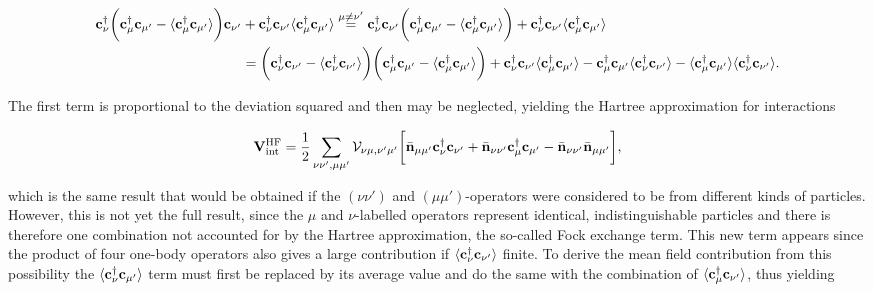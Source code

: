 \begin{equation}
    \begin{split}
    {\bf c}_{\nu}^\dagger \bigg({\bf c}_{\mu}^\dagger {\bf c}_{\mu'} - \langle {\bf c}_{\mu}^\dagger {\bf c}_{\mu'} \rangle \bigg) {\bf c}_{\nu'} &+ {\bf c}_{\nu}^\dagger {\bf c}_{\nu'} \langle {\bf c}_{\mu}^\dagger {\bf c}_{\mu'}\rangle \overset{{\mu \neq \nu'}}{=} {\bf c}_{\nu}^\dagger {\bf c}_{\nu'} \bigg({\bf c}_{\mu}^\dagger {\bf c}_{\mu'} - \langle {\bf c}_{\mu}^\dagger {\bf c}_{\mu'} \rangle \bigg) + {\bf c}_{\nu}^\dagger {\bf c}_{\nu'} \langle {\bf c}_{\mu}^\dagger {\bf c}_{\mu'}\rangle \\
    &= \bigg({\bf c}_{\nu}^\dagger {\bf c}_{\nu'} - \langle {\bf c}_{\nu}^\dagger {\bf c}_{\nu'} \rangle\bigg) \bigg({\bf c}_{\mu}^\dagger {\bf c}_{\mu'} - \langle {\bf c}_{\mu}^\dagger {\bf c}_{\mu'} \rangle \bigg) + {\bf c}_{\nu}^\dagger {\bf c}_{\nu'} \langle {\bf c}_{\mu}^\dagger {\bf c}_{\mu'}\rangle - {\bf c}_{\mu}^\dagger {\bf c}_{\mu'} \langle {\bf c}_{\nu}^\dagger {\bf c}_{\nu'} \rangle - \langle {\bf c}_{\mu}^\dagger {\bf c}_{\mu'} \rangle \langle {\bf c}_{\nu}^\dagger {\bf c}_{\nu'} \rangle.
    \end{split}
\end{equation}

The first term is proportional to the deviation squared and then may be neglected, yielding the Hartree approximation for interactions

\begin{equation}
\begin{split}
    {\bf V}_{\textnormal{int}}^{\textnormal{HF}} = \frac{1}{2} \sum_{\nu\nu', \mu\mu'} {\mathcal V}_{\nu\mu, \nu'\mu'} \bigg[ \bar{\bf n}_{\mu \mu'} {\bf c}_{\nu}^\dagger {\bf c}_{\nu'} + \bar{\bf n}_{\nu \nu'} {\bf c}_{\mu}^\dagger {\bf c}_{\mu'} - \bar{\bf n}_{\nu \nu'} \bar{\bf n}_{\mu \mu'}\bigg],
\end{split}
\end{equation}

which is the same result that would be obtained if the $(\nu \nu')$ and $(\mu \mu')$-operators were considered to be from different kinds of particles. However, this is not yet the full result, since the $\mu$ and $\nu$-labelled operators represent identical, indistinguishable particles and there is therefore one combination not accounted for by the Hartree approximation, the so-called Fock exchange term. This new term appears since the product of four one-body operators also gives a large contribution if $\langle{\bf c}_{\nu}^\dagger {\bf c}_{\nu'} \rangle$ finite. To derive the mean field contribution from this possibility the $\langle {\bf c}_{\nu}^\dagger {\bf c}_{\mu'} \rangle$ term must first be replaced by its average value and do the same with the combination of $\langle {\bf c}_{\mu}^\dagger {\bf c}_{\nu'} \rangle$, thus yielding 

